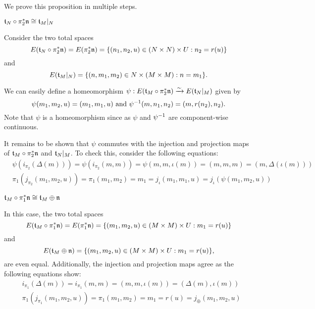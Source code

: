 \begin{myproof}
    We prove this proposition in multiple steps.
    \begin{steps}
        \item $\mathfrak{t}_N \circ \pi_2^*\mathfrak{n} \cong \mathfrak{t}_M\vert_{N}$
        
        Consider the two total spaces
        \[ E(\mathfrak{t}_N \circ \pi_2^*\mathfrak{n}) = E(\pi_2^*\mathfrak{n}) = \{(n_1, n_2, u) \in (N \times N) \times U:n_2 = r(u)\} \]
        and
        \[ E(\mathfrak{t}_M\vert_{N}) = \{(n, m_1, m_2) \in N \times (M \times M):n = m_1\}. \]

        We can easily define a homeomorphism $\psi: E(\mathfrak{t}_M \circ \pi_2^*\mathfrak{n}) \xrightarrow{\sim} E(\mathfrak{t}_N\vert_{M})$ given by
        \[ \psi(m_1, m_2, u) = (m_1, m_1, u) \text{ and } \psi^{-1}(m, n_1, n_2) = (m, r(n_2), n_2). \]
        Note that $\psi$ is a homeomorphism since as $\psi$ and $\psi^{-1}$ are component-wise continuous.

        It remains to be shown that $\psi$
        commutes with the injection and projection maps of $\mathfrak{t}_M \circ \pi_2^*\mathfrak{n}$ and $\mathfrak{t}_N\vert_{M}$.
        To check this, consider the following equations:
        \begin{align}
            & \psi(i_{\pi_2}(\Delta(m))) = \psi(i_{\pi_2}(m, m)) = \psi(m, m, \iota(m)) = (m, m, m) = (m, \Delta(\iota(m))) \\
            & \pi_1(j_{\pi_2}(m_1, m_2, u)) = \pi_1(m_1, m_2) = m_1 = j_\iota(m_1, m_1, u) = j_\iota(\psi(m_1, m_2, u)) 
        \end{align}
        
        \item $\mathfrak{t}_M \circ \pi_1^*\mathfrak{n} \cong \mathfrak{t}_M \oplus{} \mathfrak{n}$
        
        In this case, the two total spaces
        \[ E(\mathfrak{t}_M \circ \pi_1^*\mathfrak{n}) = E(\pi_1^*\mathfrak{n}) = \{(m_1, m_2, u) \in (M \times M) \times U:m_1 = r(u)\} \]
        and
        \[ E(\mathfrak{t}_M \oplus{} \mathfrak{n}) = \{(m_1, m_2, u) \in (M \times M) \times U:m_1 = r(u)\}, \]
        are even equal.
        Additionally,
        the injection and projection maps agree as the following equations show:
        \begin{align}
            & i_{\pi_1}(\Delta(m)) = i_{\pi_1}(m, m) = (m, m, \iota(m)) = (\Delta(m), \iota(m)) \\
            & \pi_1(j_{\pi_1}(m_1, m_2, u)) = \pi_1(m_1, m_2) = m_1 = r(u) = j_{\oplus}(m_1, m_2, u)
        \end{align}


\end{steps}
\end{myproof}
